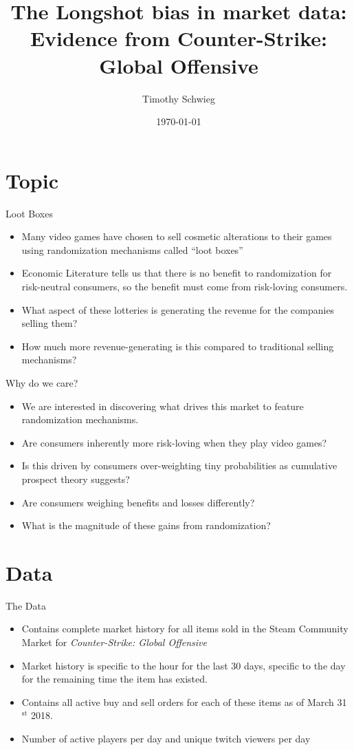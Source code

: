 \documentclass[presentation]{beamer}
\author{Timothy Schwieg}
\date{\today}
\title{The Longshot bias in market data: Evidence from Counter-Strike: Global Offensive}
\begin{document}
\maketitle


\section{Topic}
\label{sec:org94faeea}
\begin{frame}[label={sec:orgcbb025e}]{Loot Boxes}
\begin{itemize}
\item Many video games have chosen to sell cosmetic alterations to their
games using randomization mechanisms called ``loot boxes''
\item Economic Literature tells us that there is no benefit to
randomization for risk-neutral consumers, so the benefit must come
from risk-loving consumers.
\item What aspect of these lotteries is generating the revenue for the
companies selling them?
\item How much more revenue-generating is this compared to traditional
selling mechanisms?
\end{itemize}
\end{frame}

\begin{frame}[label={sec:org65cca0a}]{Why do we care?}
\begin{itemize}
\item We are interested in discovering what drives this market to feature
randomization mechanisms.
\item Are consumers inherently more risk-loving when they play video
games?
\item Is this driven by consumers over-weighting tiny probabilities as
cumulative prospect theory suggests?
\item Are consumers weighing benefits and losses differently?
\item What is the magnitude of these gains from randomization?
\end{itemize}
\end{frame}

\section{Data}
\label{sec:org179fc23}
\begin{frame}[label={sec:orgd59b2bd}]{The Data}
\begin{itemize}
\item Contains complete market history for all items sold in the Steam
Community Market for \emph{Counter-Strike: Global Offensive}
\item Market history is specific to the hour for the last 30 days,
specific to the day for the remaining time the item has existed.
\item Contains all active buy and sell orders for each of these items as
of March 31\(^{\text{st}}\) 2018.
\item Number of active players per day and unique twitch viewers per day
\end{itemize}
\end{frame}
\end{document}
